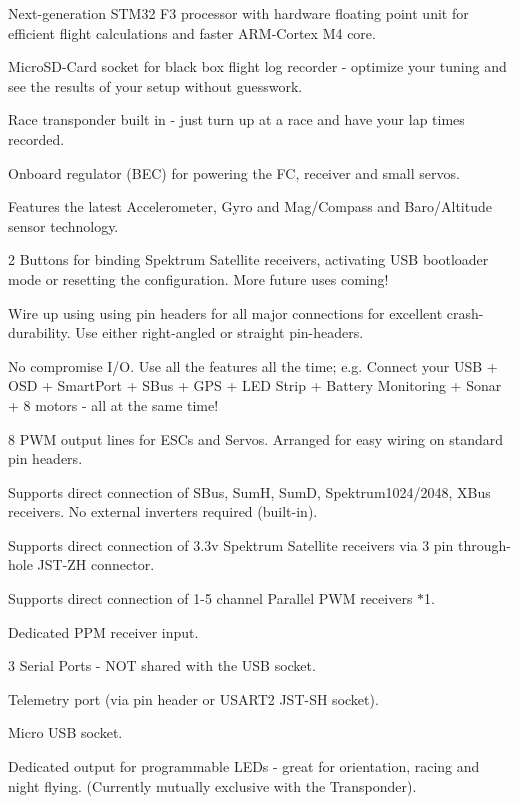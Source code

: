 \begin{DoxyItemize}
\item Next-\/generation S\+T\+M32 F3 processor with hardware floating point unit for efficient flight calculations and faster A\+R\+M-\/\+Cortex M4 core.
\item Micro\+S\+D-\/\+Card socket for black box flight log recorder -\/ optimize your tuning and see the results of your setup without guesswork.
\item Race transponder built in -\/ just turn up at a race and have your lap times recorded.
\item Onboard regulator (B\+E\+C) for powering the F\+C, receiver and small servos.
\item Features the latest Accelerometer, Gyro and Mag/\+Compass and Baro/\+Altitude sensor technology.
\item 2 Buttons for binding Spektrum Satellite receivers, activating U\+S\+B bootloader mode or resetting the configuration. More future uses coming!
\item Wire up using using pin headers for all major connections for excellent crash-\/durability. Use either right-\/angled or straight pin-\/headers.
\item No compromise I/\+O. Use all the features all the time; e.\+g. Connect your U\+S\+B + O\+S\+D + Smart\+Port + S\+Bus + G\+P\+S + L\+E\+D Strip + Battery Monitoring + Sonar + 8 motors -\/ all at the same time!
\item 8 P\+W\+M output lines for E\+S\+Cs and Servos. Arranged for easy wiring on standard pin headers.
\item Supports direct connection of S\+Bus, Sum\+H, Sum\+D, Spektrum1024/2048, X\+Bus receivers. No external inverters required (built-\/in).
\item Supports direct connection of 3.\+3v Spektrum Satellite receivers via 3 pin through-\/hole J\+S\+T-\/\+Z\+H connector.
\item Supports direct connection of 1-\/5 channel Parallel P\+W\+M receivers $\ast$1.
\item Dedicated P\+P\+M receiver input.
\item 3 Serial Ports -\/ N\+O\+T shared with the U\+S\+B socket.
\item Telemetry port (via pin header or U\+S\+A\+R\+T2 J\+S\+T-\/\+S\+H socket).
\item Micro U\+S\+B socket.
\item Dedicated output for programmable L\+E\+Ds -\/ great for orientation, racing and night flying. (Currently mutually exclusive with the Transponder).

\end{DoxyItemize}
